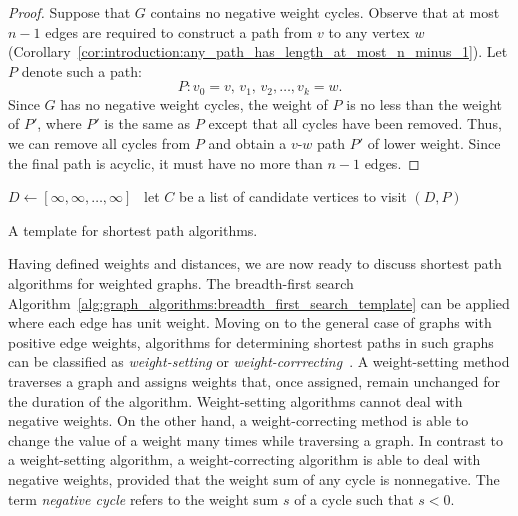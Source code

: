\begin{proof}
Suppose that $G$ contains no negative weight cycles. Observe that at
most $n - 1$ edges are required to construct a path from $v$ to any
vertex $w$
(Corollary~\ref{cor:introduction:any_path_has_length_at_most_n_minus_1}).
Let $P$ denote such a path:
\[
P: v_0 = v,\, v_1,\, v_2, \dots, v_k = w.
\]
Since $G$ has no negative weight cycles, the weight of $P$ is no less
than the weight of $P'$, where $P'$ is the same as $P$ except that all
cycles have been removed. Thus, we can remove all cycles from $P$ and
obtain a $v$-$w$ path $P'$ of lower weight. Since the final path is
acyclic, it must have no more than $n - 1$ edges.
\end{proof}

\begin{algorithm}[!htpb]
\dontprintsemicolon  %
\BlankLine
$D \leftarrow [\infty, \infty, \dots, \infty]$~\;
let $C$ be a list of candidate vertices to visit\;
\Return $(D,P)$\;
\caption{A template for shortest path algorithms.}
\label{alg:graph_algorithms:generic_shortest_path_algorithm}
\end{algorithm}

Having defined weights and distances, we are now ready to discuss
shortest path algorithms for weighted graphs. The breadth-first search
Algorithm~\ref{alg:graph_algorithms:breadth_first_search_template} can
be applied where each edge has unit weight. Moving on to the general
case of graphs with positive edge weights, algorithms for determining
shortest paths in such graphs can be classified as
\emph{weight-setting} or
\emph{weight-corrrecting}~\cite{GalloPallottino1986}. A weight-setting
method traverses a graph and assigns weights that, once assigned,
remain unchanged for the duration of the algorithm. Weight-setting
algorithms cannot deal with negative weights. On the other hand, a
weight-correcting method is able to change the value of a weight many
times while traversing a graph. In contrast to a weight-setting
algorithm, a weight-correcting algorithm is able to deal with negative
weights, provided that the weight sum of any cycle is
nonnegative. The term \emph{negative cycle} refers to the weight sum $s$
of a cycle such that $s < 0$.

